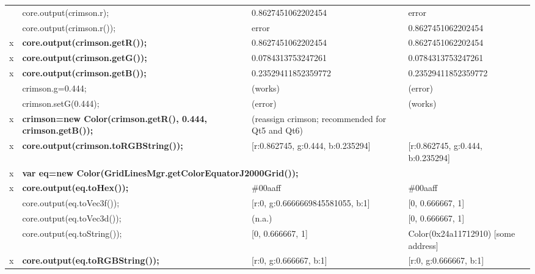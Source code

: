 \begin{table}
{\begin{tabular}{rlll}
 &core.output(crimson.r);                       &  0.8627451062202454                                                   &  error                                   \\
 &core.output(crimson.r());                     &  error                                                                &  0.8627451062202454                      \\
x&\textbf{core.output(crimson.getR());}         &  0.8627451062202454                                                   &  0.8627451062202454                      \\
x&\textbf{core.output(crimson.getG());}         &  0.0784313753247261                                                   &  0.0784313753247261                      \\
x&\textbf{core.output(crimson.getB());}         &  0.23529411852359772                                                  &  0.23529411852359772                     \\
 &crimson.g=0.444;                              &  (works)                                                              & (error)                                  \\
 &crimson.setG(0.444);                          &  (error)                                                              & (works)                                  \\
x&\textbf{crimson=new Color(crimson.getR(), 0.444, crimson.getB());} & (reassign crimson; recommended for Qt5 and Qt6)  & \\
x&\textbf{core.output(crimson.toRGBString());}  &  [r:0.862745, g:0.444, b:0.235294]                                    & [r:0.862745, g:0.444, b:0.235294]        \\\hline

x&\multicolumn{2}{l}{\textbf{var eq=new Color(GridLinesMgr.getColorEquatorJ2000Grid());}}                               &                                          \\
x&\textbf{core.output(eq.toHex());}             &  \#00aaff                                                             &  \#00aaff                                \\
 &core.output(eq.toVec3f());                    &  [r:0, g:0.6666669845581055, b:1]                                     &  [0, 0.666667, 1]                        \\
 &core.output(eq.toVec3d());                    &  (n.a.)                                                               &  [0, 0.666667, 1]                        \\
 &core.output(eq.toString());                   &  [0, 0.666667, 1]                                                     &  Color(0x24a11712910) [some address]     \\
x&\textbf{core.output(eq.toRGBString());}       &  [r:0, g:0.666667, b:1]                                               &  [r:0, g:0.666667, b:1]                  \\\hline


\end{tabular}}
\end{table}
